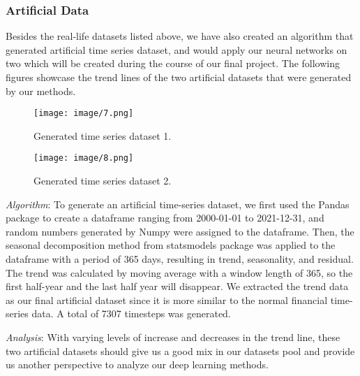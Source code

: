 \documentclass[letterpaper, 10 pt, conference]{ieeeconf}  %
\begin{document}
        \subsubsection{Artificial Data} Besides the real-life datasets listed above, we have also created an algorithm that generated artificial time series dataset, and would apply our neural networks on two which will be created during the course of our final project. The following figures showcase the trend lines of the two artificial datasets that were generated by our methods.
        \begin{figure}[thpb]
            \centering
            \texttt{[image: image/7.png]}
            \caption{Generated time series dataset 1.}
            \label{figurelabel}
            \centering
            \texttt{[image: image/8.png]}
            \caption{Generated time series dataset 2.}
            \label{figurelabel}
        \end{figure}

        \textit{Algorithm}: To generate an artificial time-series dataset, we first used the Pandas package to create a dataframe ranging from 2000-01-01 to 2021-12-31,  and random numbers generated by Numpy were assigned to the dataframe. Then, the seasonal decomposition method from statsmodels package was applied to the dataframe with a period of 365 days, resulting in trend, seasonality, and residual. The trend was calculated by moving average with a window length of 365, so the first half-year and the last half year will disappear. We extracted the trend data as our final artificial dataset since it is more similar to the normal financial time-series data. A total of 7307 timesteps was generated.

        \textit{Analysis}: With varying levels of increase and decreases in the trend line, these two artificial datasets should give us a good mix in our datasets pool and provide us another perspective to analyze our deep learning methods.
    
\end{document}
